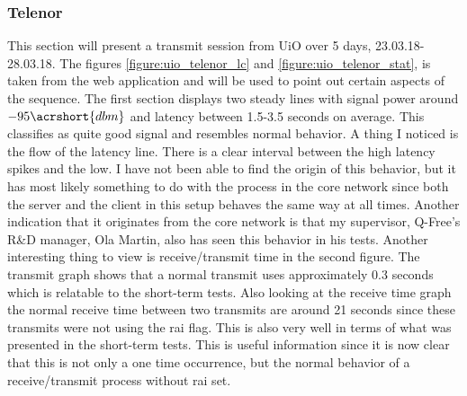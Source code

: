 \documentclass[USenglish]{ifimaster}  %
\begin{document}
\subsubsection{Telenor}
This section will present a transmit session from UiO over 5 days, 23.03.18-28.03.18. The figures \vref{figure:uio_telenor_lc} and \vref{figure:uio_telenor_stat}, is taken from the web application and will be used to point out certain aspects of the sequence. The first section displays two steady lines with signal power around ${-95 \acrshort{dbm}}$ and latency between 1.5-3.5 seconds on average. This classifies as quite good signal and resembles normal behavior. A thing I noticed is the flow of the latency line. There is a clear interval between the high latency spikes and the low. I have not been able to find the origin of this behavior, but it has most likely something to do with the process in the core network since both the server and the client in this setup behaves the same way at all times. Another indication that it originates from the core network is that my supervisor, Q-Free's R\&D manager, Ola Martin, also has seen this behavior in his tests\cite{person:ola}. Another interesting thing to view is receive/transmit time in the second figure. The transmit graph shows that a normal transmit uses approximately 0.3 seconds which is relatable to the short-term tests. Also looking at the receive time graph the normal receive time between two transmits are around 21 seconds since these transmits were not using the \acrshort{rai} flag. This is also very well in terms of what was presented in the short-term tests. This is useful information since it is now clear that this is not only a one time occurrence, but the normal behavior of a receive/transmit process without \acrshort{rai} set.
\end{document}
